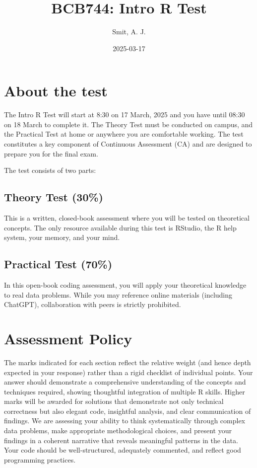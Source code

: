 \documentclass[
  10t,
]{article}
\title{BCB744: Intro R Test}
\author{Smit, A. J.}
\date{2025-03-17}
\begin{document}
\maketitle


\section{About the test}\label{about-the-test}

The Intro R Test will start at 8:30 on 17 March, 2025 and you have until
08:30 on 18 March to complete it. The Theory Test must be conducted on
campus, and the Practical Test at home or anywhere you are comfortable
working. The test constitutes a key component of Continuous Assessment
(CA) and are designed to prepare you for the final exam.

The test consists of two parts:

\subsection{Theory Test (30\%)}\label{theory-test-30}

This is a written, closed-book assessment where you will be tested on
theoretical concepts. The only resource available during this test is
RStudio, the R help system, your memory, and your mind.

\subsection{Practical Test (70\%)}\label{practical-test-70}

In this open-book coding assessment, you will apply your theoretical
knowledge to real data problems. While you may reference online
materials (including ChatGPT), collaboration with peers is strictly
prohibited.

\section{Assessment Policy}\label{assessment-policy}

{The marks indicated for each section reflect the relative weight (and
hence depth expected in your response) rather than a rigid checklist of
individual points.} Your answer should demonstrate a comprehensive
understanding of the concepts and techniques required, showing
thoughtful integration of multiple R skills. Higher marks will be
awarded for solutions that demonstrate not only technical correctness
but also elegant code, insightful analysis, and clear communication of
findings. We are assessing your ability to think systematically through
complex data problems, make appropriate methodological choices, and
present your findings in a coherent narrative that reveals meaningful
patterns in the data. Your code should be well-structured, adequately
commented, and reflect good programming practices.
\end{document}
